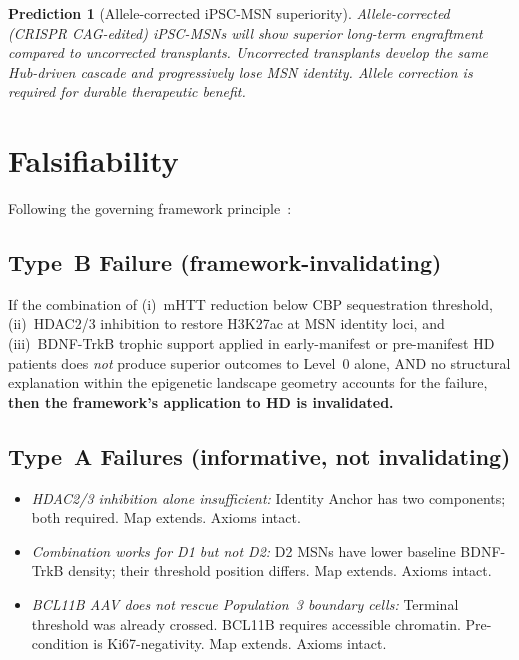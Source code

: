 \documentclass[12pt,a4paper]{article}
\newtheorem{prediction}{Prediction}
\begin{document}
\begin{prediction}[Allele-corrected iPSC-MSN superiority]
\label{pred:ipsc}
Allele-corrected (CRISPR CAG-edited) iPSC-MSNs will show
superior long-term engraftment compared to uncorrected
transplants. Uncorrected transplants develop the same
Hub-driven cascade and progressively lose MSN identity.
Allele correction is required for durable therapeutic
benefit.
\end{prediction}

\section{Falsifiability}

Following the governing framework
principle~\cite{FalsThm2026}:

\subsection{Type~B Failure (framework-invalidating)}

If the combination of (i)~mHTT reduction below CBP
sequestration threshold, (ii)~HDAC2/3 inhibition to
restore H3K27ac at MSN identity loci, and (iii)~BDNF-TrkB
trophic support applied in early-manifest or pre-manifest
HD patients does \emph{not} produce superior outcomes to
Level~0 alone, AND no structural explanation within the
epigenetic landscape geometry accounts for the failure,
\textbf{then the framework's application to HD is
invalidated.}

\subsection{Type~A Failures (informative, not invalidating)}

\begin{itemize}
  \item \textit{HDAC2/3 inhibition alone insufficient:}
    Identity Anchor has two components; both required.
    Map extends. Axioms intact.

  \item \textit{Combination works for D1 but not D2:}
    D2 MSNs have lower baseline BDNF-TrkB density; their
    threshold position differs. Map extends. Axioms intact.

  \item \textit{BCL11B AAV does not rescue Population~3
    boundary cells:}
    Terminal threshold was already crossed. BCL11B requires
    accessible chromatin. Pre-condition is Ki67-negativity.
    Map extends. Axioms intact.
\end{itemize}
\end{document}
